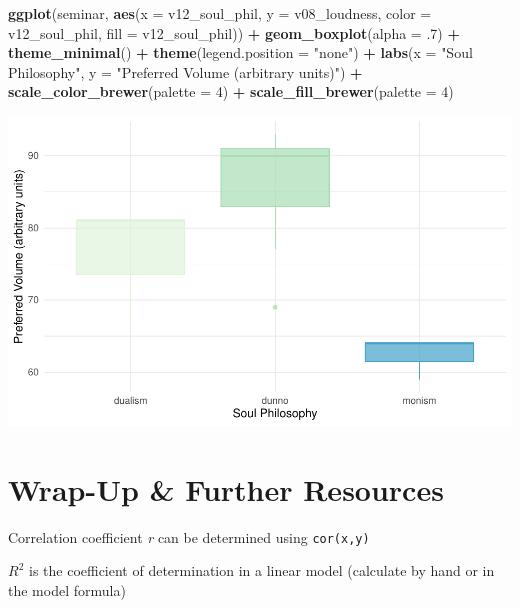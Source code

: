 \documentclass[
]{book}
\newenvironment{Shaded}{\begin{snugshade}}{\end{snugshade}}
\newcommand{\AttributeTok}[1]{\textcolor[rgb]{0.13,0.29,0.53}{#1}}
\newcommand{\DecValTok}[1]{\textcolor[rgb]{0.00,0.00,0.81}{#1}}
\newcommand{\FunctionTok}[1]{\textcolor[rgb]{0.13,0.29,0.53}{\textbf{#1}}}
\newcommand{\NormalTok}[1]{#1}
\newcommand{\SpecialCharTok}[1]{\textcolor[rgb]{0.81,0.36,0.00}{\textbf{#1}}}
\newcommand{\StringTok}[1]{\textcolor[rgb]{0.31,0.60,0.02}{#1}}
\begin{document}
\begin{Shaded}
\begin{Highlighting}[]
\FunctionTok{ggplot}\NormalTok{(seminar, }\FunctionTok{aes}\NormalTok{(}\AttributeTok{x =}\NormalTok{ v12\_soul\_phil, }\AttributeTok{y =}\NormalTok{ v08\_loudness, }
                    \AttributeTok{color =}\NormalTok{ v12\_soul\_phil, }\AttributeTok{fill =}\NormalTok{ v12\_soul\_phil)) }\SpecialCharTok{+}
  \FunctionTok{geom\_boxplot}\NormalTok{(}\AttributeTok{alpha =}\NormalTok{ .}\DecValTok{7}\NormalTok{) }\SpecialCharTok{+} \FunctionTok{theme\_minimal}\NormalTok{() }\SpecialCharTok{+} \FunctionTok{theme}\NormalTok{(}\AttributeTok{legend.position =} \StringTok{"none"}\NormalTok{) }\SpecialCharTok{+}
  \FunctionTok{labs}\NormalTok{(}\AttributeTok{x =} \StringTok{"Soul Philosophy"}\NormalTok{, }\AttributeTok{y =} \StringTok{"Preferred Volume (arbitrary units)"}\NormalTok{) }\SpecialCharTok{+}
  \FunctionTok{scale\_color\_brewer}\NormalTok{(}\AttributeTok{palette =} \DecValTok{4}\NormalTok{) }\SpecialCharTok{+} \FunctionTok{scale\_fill\_brewer}\NormalTok{(}\AttributeTok{palette =} \DecValTok{4}\NormalTok{)}
\end{Highlighting}
\end{Shaded}

\includegraphics{_main_files/figure-latex/unnamed-chunk-83-1.pdf}

\section{Wrap-Up \& Further Resources}\label{wrap-up-further-resources-7}

Correlation coefficient \emph{r} can be determined using \texttt{cor(x,y)}

\(R^2\) is the coefficient of determination in a linear model (calculate by hand or in the model formula)
\end{document}
